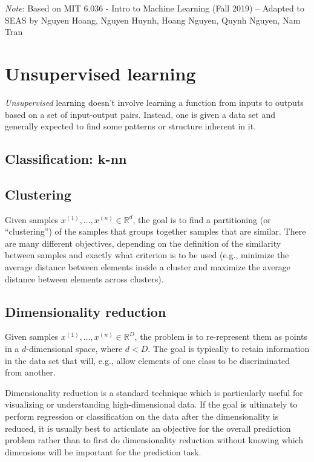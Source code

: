 \documentclass[11pt]{article}
\newcommand\ex[2]{#1^{(#2)}}
\newcommand{\R}{\mathbb{R}}
\begin{document}





\emph{Note}: Based on MIT 6.036 - Intro to Machine Learning (Fall 2019) -- Adapted to SEAS by Nguyen Hoang, Nguyen Huynh, Hoang Nguyen, Quynh Nguyen, Nam Tran

\section{Unsupervised learning}
{\em Unsupervised} learning doesn't
involve learning a function from inputs to outputs based on a set of
input-output pairs.  Instead, one is given a data set and generally
expected to find some patterns or structure inherent in it.

\subsection{Classification: k-nn}

\subsection{Clustering}

Given samples $\ex{x}{1}, \ldots, \ex{x}{n} \in \R^d$, the goal is to
find a partitioning (or ``clustering'') of the samples that groups together samples that are
similar.  There are many different objectives, depending on the
definition of the similarity between samples and exactly what
criterion is to be used (e.g., minimize the average distance between
elements inside a cluster and maximize the average distance between
elements across clusters).
\subsection{Dimensionality reduction}

Given samples $\ex{x}{1}, \ldots, \ex{x}{n} \in \R^D$, the problem is to
re-represent them as points in a $d$-dimensional space, where $d <
D$.  The goal is typically to retain information in the data set that
will, e.g., allow elements of one class to be discriminated from
another.

Dimensionality reduction is a standard technique which is particularly useful for
visualizing or understanding high-dimensional data.  If the goal is
ultimately to perform regression or classification on the data after
the dimensionality is reduced, it is usually best to articulate an objective
for the overall prediction problem rather than to first do
dimensionality reduction without knowing which dimensions will be
important for the prediction task.
\end{document}
